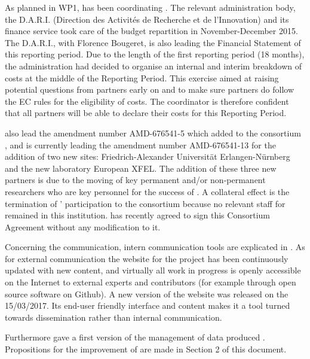 \documentclass{deliverablereport}
\begin{document}
As planned in WP1,  has been coordinating \ODK.  The  relevant administration body, the D.A.R.I. (Direction des Activités de Recherche et de l'Innovation) and its finance service took care of the budget repartition in November-December 2015. The D.A.R.I., with Florence Bougeret, is also leading the Financial Statement of this reporting period. Due to the length of the first reporting period (18 months), the  administration had decided to organise an internal and interim
breakdown of costs at the middle of the Reporting Period. This exercise aimed at raising potential questions
from partners early on and to make sure partners do follow the EC
rules for the eligibility of costs. The coordinator is therefore confident that all partners will be able to declare their costs for this Reporting Period.

 also lead the amendment number AMD-676541-5 which added to the consortium , and is currently leading the amendment number AMD-676541-13 for the addition of two new sites: Friedrich-Alexander Universität Erlangen-Nürnberg and the new laboratory European XFEL. The addition of these three new partners is due to the moving of key permanent and/or non-permanent researchers who are key personnel for the success of \ODK. A collateral effect is the termination of ' participation to the consortium because no relevant staff for \ODK remained in this institution.
 has recently agreed to sign this Consortium Agreement
without any modification to it.


Concerning the communication, intern communication tools are explicated in .
As for external communication the website for the project has been continuously
updated with new content, and virtually all work in progress is openly
accessible on the Internet to external experts and contributors (for
example through open source software on Github). A new version of the website was released on the 15/03/2017. Its end-user friendly interface and content makes it a tool turned towards dissemination rather than internal communication.

 
Furthermore  gave a first version of the management of data produced \ODK. Propositions for the improvement of are made in Section 2 of this document. 


\paragraph{}
\end{document}
